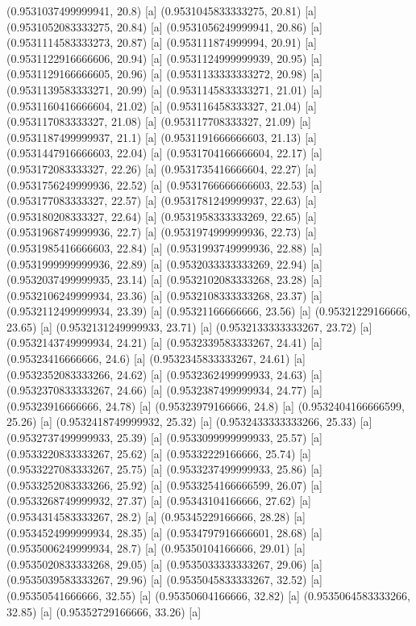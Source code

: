 {{{(0.9531037499999941, 20.8) [a] 
(0.9531045833333275, 20.81) [a] 
(0.9531052083333275, 20.84) [a] 
(0.9531056249999941, 20.86) [a] 
(0.9531114583333273, 20.87) [a] 
(0.953111874999994, 20.91) [a] 
(0.9531122916666606, 20.94) [a] 
(0.9531124999999939, 20.95) [a] 
(0.9531129166666605, 20.96) [a] 
(0.9531133333333272, 20.98) [a] 
(0.9531139583333271, 20.99) [a] 
(0.9531145833333271, 21.01) [a] 
(0.9531160416666604, 21.02) [a] 
(0.953116458333327, 21.04) [a] 
(0.953117083333327, 21.08) [a] 
(0.953117708333327, 21.09) [a] 
(0.9531187499999937, 21.1) [a] 
(0.9531191666666603, 21.13) [a] 
(0.9531447916666603, 22.04) [a] 
(0.9531704166666604, 22.17) [a] 
(0.953172083333327, 22.26) [a] 
(0.9531735416666604, 22.27) [a] 
(0.9531756249999936, 22.52) [a] 
(0.9531766666666603, 22.53) [a] 
(0.953177083333327, 22.57) [a] 
(0.9531781249999937, 22.63) [a] 
(0.953180208333327, 22.64) [a] 
(0.9531958333333269, 22.65) [a] 
(0.9531968749999936, 22.7) [a] 
(0.9531974999999936, 22.73) [a] 
(0.9531985416666603, 22.84) [a] 
(0.9531993749999936, 22.88) [a] 
(0.9531999999999936, 22.89) [a] 
(0.9532033333333269, 22.94) [a] 
(0.9532037499999935, 23.14) [a] 
(0.9532102083333268, 23.28) [a] 
(0.9532106249999934, 23.36) [a] 
(0.9532108333333268, 23.37) [a] 
(0.9532112499999934, 23.39) [a] 
(0.95321166666666, 23.56) [a] 
(0.95321229166666, 23.65) [a] 
(0.9532131249999933, 23.71) [a] 
(0.9532133333333267, 23.72) [a] 
(0.9532143749999934, 24.21) [a] 
(0.9532339583333267, 24.41) [a] 
(0.95323416666666, 24.6) [a] 
(0.9532345833333267, 24.61) [a] 
(0.9532352083333266, 24.62) [a] 
(0.9532362499999933, 24.63) [a] 
(0.9532370833333267, 24.66) [a] 
(0.9532387499999934, 24.77) [a] 
(0.95323916666666, 24.78) [a] 
(0.95323979166666, 24.8) [a] 
(0.9532404166666599, 25.26) [a] 
(0.9532418749999932, 25.32) [a] 
(0.9532433333333266, 25.33) [a] 
(0.9532737499999933, 25.39) [a] 
(0.9533099999999933, 25.57) [a] 
(0.9533220833333267, 25.62) [a] 
(0.95332229166666, 25.74) [a] 
(0.9533227083333267, 25.75) [a] 
(0.9533237499999933, 25.86) [a] 
(0.9533252083333266, 25.92) [a] 
(0.9533254166666599, 26.07) [a] 
(0.9533268749999932, 27.37) [a] 
(0.95343104166666, 27.62) [a] 
(0.9534314583333267, 28.2) [a] 
(0.95345229166666, 28.28) [a] 
(0.9534524999999934, 28.35) [a] 
(0.9534797916666601, 28.68) [a] 
(0.9535006249999934, 28.7) [a] 
(0.95350104166666, 29.01) [a] 
(0.9535020833333268, 29.05) [a] 
(0.9535033333333267, 29.06) [a] 
(0.9535039583333267, 29.96) [a] 
(0.9535045833333267, 32.52) [a] 
(0.95350541666666, 32.55) [a] 
(0.95350604166666, 32.82) [a] 
(0.9535064583333266, 32.85) [a] 
(0.95352729166666, 33.26) [a] 
}}}
